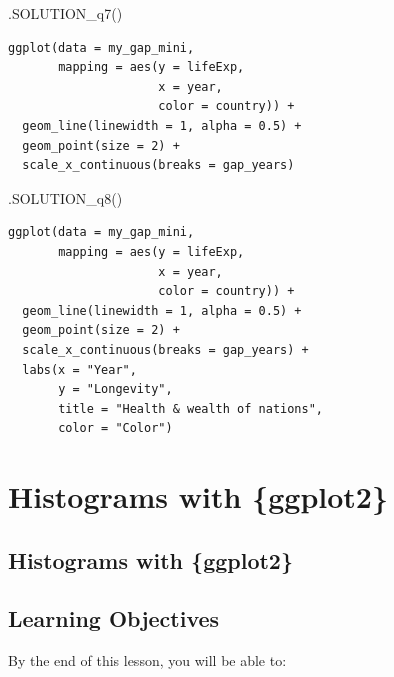 \documentclass[
  letterpaper,
  DIV=11,
  numbers=noendperiod]{scrreprt}
\newenvironment{Shaded}{\begin{snugshade}}{\end{snugshade}}
\newcommand{\FunctionTok}[1]{\textcolor[rgb]{0.28,0.35,0.67}{#1}}
\newcommand{\NormalTok}[1]{\textcolor[rgb]{0.00,0.23,0.31}{#1}}
\begin{document}
\begin{Shaded}
\begin{Highlighting}[]
\FunctionTok{.SOLUTION\_q7}\NormalTok{()}
\end{Highlighting}
\end{Shaded}

\begin{verbatim}
ggplot(data = my_gap_mini, 
       mapping = aes(y = lifeExp, 
                     x = year, 
                     color = country)) +
  geom_line(linewidth = 1, alpha = 0.5) +
  geom_point(size = 2) +
  scale_x_continuous(breaks = gap_years)
\end{verbatim}

\begin{Shaded}
\begin{Highlighting}[]
\FunctionTok{.SOLUTION\_q8}\NormalTok{()}
\end{Highlighting}
\end{Shaded}

\begin{verbatim}
ggplot(data = my_gap_mini, 
       mapping = aes(y = lifeExp, 
                     x = year, 
                     color = country)) +
  geom_line(linewidth = 1, alpha = 0.5) +
  geom_point(size = 2) +
  scale_x_continuous(breaks = gap_years) +
  labs(x = "Year", 
       y = "Longevity",
       title = "Health & wealth of nations",
       color = "Color")
\end{verbatim}


\hypertarget{histograms-with-ggplot2}{%
\chapter{Histograms with \{ggplot2\}}\label{histograms-with-ggplot2}}

\hypertarget{histograms-with-ggplot2-1}{%
\section{Histograms with \{ggplot2\}}\label{histograms-with-ggplot2-1}}

\hypertarget{learning-objectives-17}{%
\section{Learning Objectives}\label{learning-objectives-17}}

By the end of this lesson, you will be able to:
\end{document}
